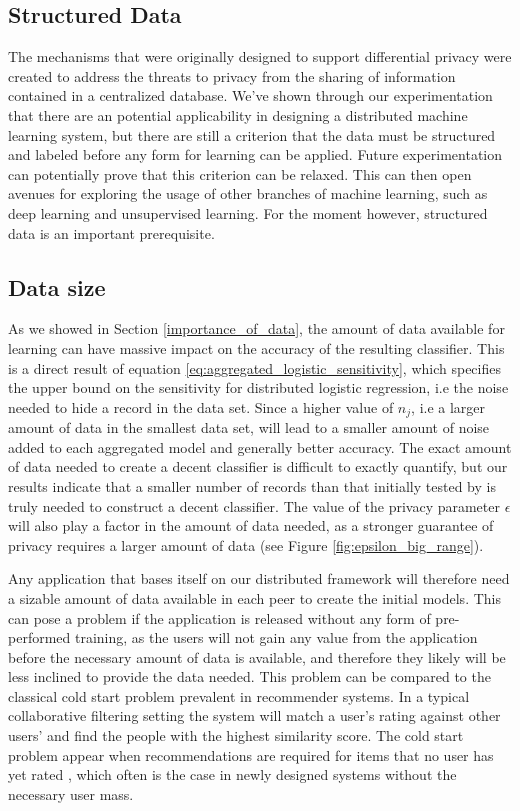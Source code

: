 \subsection{Structured Data}
The mechanisms that were originally designed to support differential privacy were created to address the threats to privacy from the sharing of information contained in a centralized database. We've shown through our experimentation that there are an potential applicability in designing a distributed machine learning system, but there are still a criterion that the data must be structured and labeled before any form for learning can be applied. Future experimentation can potentially prove that this criterion can be relaxed. This can then open avenues for exploring the usage of other branches of machine learning, such as deep learning and unsupervised learning. For the moment however, structured data is an important prerequisite.

\subsection{Data size}
As we showed in Section \ref{importance_of_data}, the amount of data available for learning can have massive impact on the accuracy of the resulting classifier. This is a direct result of equation \ref{eq:aggregated_logistic_sensitivity}, which specifies the upper bound on the sensitivity for distributed logistic regression, i.e the noise needed to hide a record in the data set. Since a higher value of $n_j$, i.e a larger amount of data in the smallest data set, will lead to a smaller amount of noise added to each aggregated model and generally better accuracy. The exact amount of data needed to create a decent classifier is difficult to exactly quantify, but our results indicate that a smaller number of records than that initially tested by \cite{pathak2010diffprivhomo} is truly needed to construct a decent classifier. The value of the privacy parameter $\epsilon$ will also play a factor in the amount of data needed, as a stronger guarantee of privacy requires a larger amount of data (see Figure \ref{fig:epsilon_big_range}).

Any application that bases itself on our distributed framework will therefore need a sizable amount of data available in each peer to create the initial models. This can pose a problem if the application is released without any form of pre-performed training, as the users will not gain any value from the application before the necessary amount of data is available, and therefore they likely will be less inclined to provide the data needed. This problem can be compared to the classical cold start problem prevalent in recommender systems. In a typical collaborative filtering setting the system will match a user's rating against other users' and find the people with the highest similarity score. The cold start problem appear when recommendations are required for items that no user has yet rated \citep{schein2002methods}, which often is the case in newly designed systems without the necessary user mass. 



